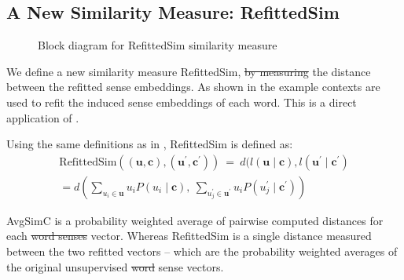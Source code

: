 \documentclass{article} %
\renewcommand{\c}{\mathbf{c}}
\renewcommand{\u}{\mathbf{u}}
\providecommand{\DIFadd}[1]{{\protect\color{blue}\uwave{#1}}} %
\providecommand{\DIFdel}[1]{{\protect\color{red}\sout{#1}}}                      %
\providecommand{\DIFaddbegin}{} %
\providecommand{\DIFaddend}{} %
\providecommand{\DIFdelbegin}{} %
\providecommand{\DIFdelend}{} %
\begin{document}
\DIFdelend \subsection{A New Similarity Measure: RefittedSim}\label{RefittedSimVsAvgSimC}
\begin{figure}
	\begin{adjustbox}{max width=\columnwidth}
	
	\end{adjustbox}
	\caption{Block diagram for RefittedSim similarity measure} \label{diaRefittedSim}
\end{figure}
We define a new similarity measure RefittedSim, \DIFdelbegin \DIFdel{by measuring }\DIFdelend \DIFaddbegin \DIFadd{as }\DIFaddend the distance between the refitted sense embeddings.
As shown in  the example contexts are used to refit the induced sense embeddings of each word.
This is a direct application of  .

Using the same definitions as in , RefittedSim is defined as:
\DIFdelbegin %
\DIFdelend \DIFaddbegin \begin{multline} \label{eq:refittedsim}
\mathrm{RefittedSim}((\u,\c),(\u^{\prime},\c^{\prime}))
\:=\: d(l(\u \mid \c), l(\u^\prime \mid \c^\prime)\\
= d\left(
\sum_{u_{i}\in\u}u_{i}P(u_{i}\mid\c),\:
\sum_{u_{j}^{\prime}\in\u^{\prime}}u_{i}P(u_{j}^{\prime}\mid\c^{\prime})\right)
\end{multline}
\DIFaddend 

AvgSimC is a probability weighted average of pairwise computed distances for each \DIFdelbegin \DIFdel{word senses }\DIFdelend \DIFaddbegin \DIFadd{sense }\DIFaddend vector.
Whereas RefittedSim is a single distance measured between the two refitted vectors -- which are the probability weighted averages of the original unsupervised \DIFdelbegin \DIFdel{word }\DIFdelend sense vectors.
\end{document}
